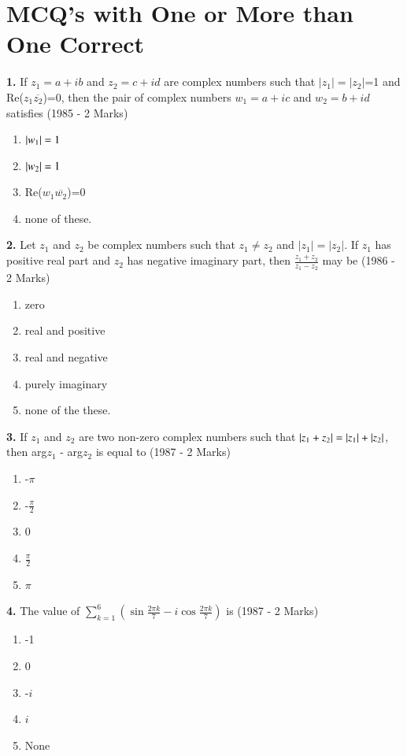 \documentclass[journal,12pt,twocolumn]{IEEEtran}
\theoremstyle{remark}
\begin{document}
\section{ MCQ's with One or More than One Correct}
\textbf{1.} If $z_{1}=a+ib$ and $z_{2}=c+id$ are complex numbers such that $|z_{1}|=|z_{2}|$=1 and Re($z_{1}\overline{z_{2}}$)=0, then the pair of complex numbers $w_{1}=a+ic$ and $w_{2}=b+id$ satisfies \hfill{(1985 - 2 Marks)}
\begin{enumerate}[label=(\alph*)]
	\item $\left\vert w_{1}\right\vert=1$
	\item $\left\vert w_{2}\right\vert=1$
	\item Re($w_{1}\overline{w_{2}}$)=0
	\item none of these.
\end{enumerate}
\textbf{2.} Let $z_{1}$ and $z_{2}$ be complex numbers such that $z_{1}\neq z_{2}$ and $|z_{1}|=|z_{2}|$. If $z_{1}$ has positive real part and $z_{2}$ has negative imaginary part, then $\frac{z_{1}+z_{2}}{z_{1}-z_{2}}$ may be \hfill{(1986 - 2 Marks)}
\begin{enumerate}[label=(\alph*)]
	\item zero
	\item real and positive
	\item real and negative
	\item purely imaginary
	\item none of the these.
\end{enumerate}
\textbf{3.} If $z_{1}$ and $z_{2}$ are two non-zero complex numbers such that $\left\vert z_{1}+z_{2}\right\vert=\left\vert z_{1}\right\vert+\left\vert z_{2}\right\vert$, then arg$z_{1}$ - arg$z_{2}$ is equal to \hfill{(1987 - 2 Marks)}
\begin{enumerate}[label=(\alph*)]
	\item -$\pi$
	\item -$\frac{\pi}{2}$
        \item 0
        \item $\frac{\pi}{2}$
	\item $\pi$
\end{enumerate}
\textbf{4.} The value of $\sum_{k=1} ^{6} (\sin \frac{2\pi k}{7}-i\cos \frac{2\pi k}{7})$ is \hfill{(1987 - 2 Marks)}
\begin{enumerate}[label=(\alph*)]
	
	\item -1
	\item 0
	\item -$i$
	\item $i$
	\item None
\end{enumerate}



\renewcommand{\thefigure}{\theenumi}
\renewcommand{\thetable}{\theenumi}
\end{document}
